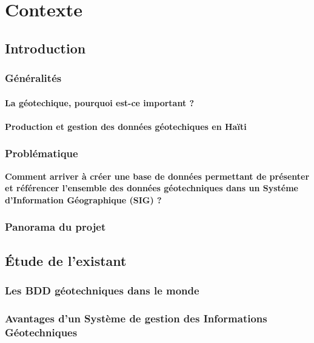 \chapter{Contexte}
    \section{Introduction}
        
        \subsection{Généralités}
            \subsubsection{La géotechique, pourquoi est-ce important ?}
            
            \subsubsection{Production et gestion des données géotechiques en Haïti}
                
        \subsection{Problématique}
        \textbf{Comment arriver à créer une base de données permettant de 
        présenter et référencer l'ensemble des données géotechniques dans un Systéme
        d’Information Géographique (SIG) ?}
       
        \subsection{Panorama du projet}
            

    \section{Étude de l'existant}
        \subsection{Les BDD géotechniques dans le monde}
            
        \subsection{Avantages d'un Système de gestion des Informations Géotechniques}
            
